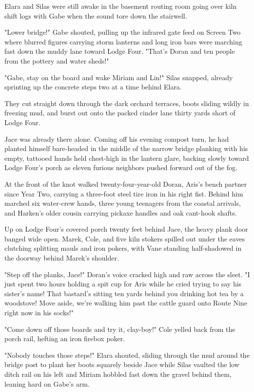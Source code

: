 Elara and Silas were still awake in the basement routing room going over kiln shift logs with Gabe when the sound tore down the stairwell.

"Lower bridge!" Gabe shouted, pulling up the infrared gate feed on Screen Two where blurred figures carrying storm lanterns and long iron bars were marching fast down the muddy lane toward Lodge Four. "That's Doran and ten people from the pottery and water sheds!"

"Gabe, stay on the board and wake Miriam and Lin!" Silas snapped, already sprinting up the concrete steps two at a time behind Elara.

They cut straight down through the dark orchard terraces, boots sliding wildly in freezing mud, and burst out onto the packed cinder lane thirty yards short of Lodge Four.

Jace was already there alone. Coming off his evening compost turn, he had planted himself bare-headed in the middle of the narrow bridge planking with his empty, tattooed hands held chest-high in the lantern glare, backing slowly toward Lodge Four's porch as eleven furious neighbors pushed forward out of the fog.

At the front of the knot walked twenty-four-year-old Doran, Aris's bench partner since Year Two, carrying a three-foot steel tire iron in his right fist. Behind him marched six water-crew hands, three young teenagers from the coastal arrivals, and Harken's older cousin carrying pickaxe handles and oak cant-hook shafts.

Up on Lodge Four's covered porch twenty feet behind Jace, the heavy plank door banged wide open. Marek, Cole, and five kiln stokers spilled out under the eaves clutching splitting mauls and iron pokers, with Vane standing half-shadowed in the doorway behind Marek's shoulder.

"Step off the planks, Jace!" Doran's voice cracked high and raw across the sleet. "I just spent two hours holding a spit cup for Aris while he cried trying to say his sister's name! That bastard's sitting ten yards behind you drinking hot tea by a woodstove! Move aside, we're walking him past the cattle guard onto Route Nine right now in his socks!"

"Come down off those boards and try it, clay-boy!" Cole yelled back from the porch rail, hefting an iron firebox poker.

"Nobody touches those steps!" Elara shouted, sliding through the mud around the bridge post to plant her boots squarely beside Jace while Silas vaulted the low ditch rail on his left and Miriam hobbled fast down the gravel behind them, leaning hard on Gabe's arm.

